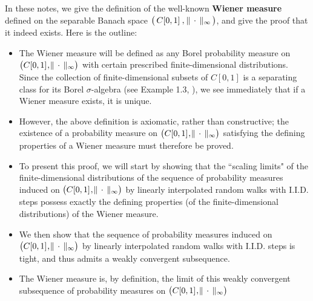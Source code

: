 \documentclass[10pt, letterpaper]{article}
\newcommand{\Czo}{C[0,1]}
\begin{document}


\pagestyle{fancy}

\chead[]{{\Large\bf The Wiener Measure on $\left(\,\Czo\,\overset{{\color{white}1}}{,}\,\Vert\,\cdot\,\Vert_{\infty}\,\right)$} \\
\vskip 0.1cm \normalsize \today}
\lfoot[]{}
\cfoot[]{}
\rfoot[]{\thepage}



\mbox{}\vskip 0.0cm
\noindent
In these notes, we give the definition of the well-known \textbf{Wiener measure} defined
on the separable Banach space
$\left(\,\Czo\,\overset{{\color{white}1}}{,}\,\Vert\,\cdot\,\Vert_{\infty}\,\right)$,
and give the proof that it indeed exists.
Here is the outline:
\begin{itemize}
\item
	The Wiener measure will be defined as any Borel probability measure on
	$\left(\Czo\overset{{\color{white}1}}{,}\Vert\,\cdot\,\Vert_{\infty}\right)$
	with certain prescribed finite-dimensional distributions.
	Since the collection of finite-dimensional subsets of $\Czo$ is a separating class
	for its Borel $\sigma$-algebra (see Example 1.3, \cite{Billingsley1999}),
	we see immediately that if a Wiener measure exists, it is unique.
\item
	However, the above definition is axiomatic, rather than constructive;
	the existence of a probability measure on
	$\left(\Czo\overset{{\color{white}1}}{,}\Vert\,\cdot\,\Vert_{\infty}\right)$
	satisfying the defining properties of a Wiener measure must therefore be proved.
\item
	To present this proof, we will start by showing that
	the ``scaling limits" of the finite-dimensional distributions of
	the sequence of probability measures induced on
	$\left(\Czo\overset{{\color{white}1}}{,}\Vert\,\cdot\,\Vert_{\infty}\right)$
	by linearly interpolated random walks with I.I.D. steps possess exactly the
	defining properties (of the finite-dimensional distributions) of the Wiener measure.
\item
	We then show that
	the sequence of probability measures induced on
	$\left(\Czo\overset{{\color{white}1}}{,}\Vert\,\cdot\,\Vert_{\infty}\right)$
	by linearly interpolated random walks with I.I.D. steps is tight, and thus
	admits a weakly convergent subsequence.
\item
	The Wiener measure is, by definition, the limit of this
	weakly convergent subsequence of probability measures on
	$\left(\Czo\overset{{\color{white}1}}{,}\Vert\,\cdot\,\Vert_{\infty}\right)$
\end{itemize} 
\end{document}
